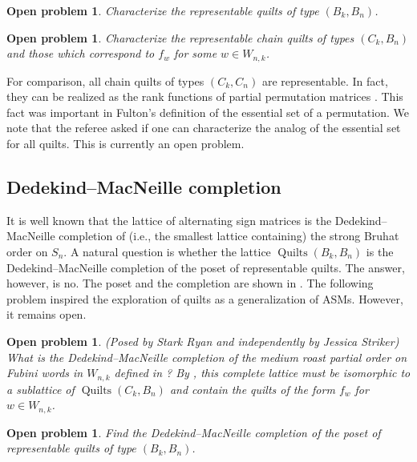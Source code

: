 \documentclass[12pt]{amsart}
\numberwithin{equation}{section}
\newtheorem{open}[theorem]{Open problem}
\theoremstyle{definition}
\newcommand{\quilt}{\operatorname{Quilts}}
\begin{document}
\begin{open}\label{open:boolean.realizability}
Characterize the representable quilts of type $(B_{k}, B_{n})$.
\end{open}



\begin{open}\label{open:flag.realizability}
Characterize the representable chain quilts of types $(C_{k}, B_{n})$ and
those which correspond to $f_{w}$ for some $w \in W_{n,k}$.  
\end{open}


For comparison, all chain quilts of types $(C_{k}, C_{n})$ are
representable.  In fact, they can be realized as the rank functions of
partial permutation matrices \cite[Lem. 3.1]{Fulton1}. This fact was
important in Fulton's definition of the essential set of a
permutation.  We note that the referee asked if one can characterize
the analog of the essential set for all quilts.  This is currently an
open problem.


\subsection*{Dedekind--MacNeille completion}


It is well known that the lattice of alternating sign matrices is the
Dedekind--MacNeille completion of (i.e., the smallest lattice
containing) the strong Bruhat order on $S_n$. A natural question is
whether the lattice $\quilt(B_k, B_n)$ is the Dedekind--MacNeille
completion of the poset of representable quilts. The answer, however,
is no. The poset and the completion are shown in .  The
following problem inspired the exploration of quilts as a
generalization of ASMs.  However, it remains open.

\begin{open}\label{open:flag.completion}(Posed by Stark Ryan and
independently by Jessica Striker) What is the Dedekind--MacNeille
completion of the medium roast partial order on Fubini words in
$W_{n,k}$ defined in ?  By
, this complete lattice must be
isomorphic to a sublattice of $\quilt(C_{k},B_{n})$ and contain the
quilts of the form $f_{w}$ for $w \in W_{n,k}$.
\end{open}



\begin{open}\label{open:bbcompletion}
Find the Dedekind--MacNeille completion of the poset of representable
quilts of type $(B_{k},B_{n})$.
\end{open}
\end{document}
